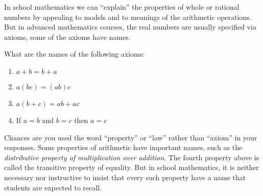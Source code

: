 
\begin{question}
In school mathematics we can ``explain'' the properties of whole or rational numbers by appealing to models and to meanings of the arithmetic operations.  But in advanced mathematics courses, the real numbers are usually specified via axioms, some of the axioms have names.  

What are the names of the following axioms:  
\begin{enumerate}
\item $a + b = b + a$  
\item $a(bc) = (ab)c$
\item $a(b+c) = ab + ac$
\item If $a = b$ and $b = c$ then $a = c$ 
\end{enumerate}
\end{question}
\QM

Chances are you used the word ``property'' or ``law'' rather than ``axiom'' in your responses.  Some properties of arithmetic have important names, such as the \emph{distributive property of multiplication over addition}.  The fourth property above is called the transitive property of equality.  But in school mathematics, it is neither necessary nor instructive to insist that every such property have a name that students are expected to recall.  


%



